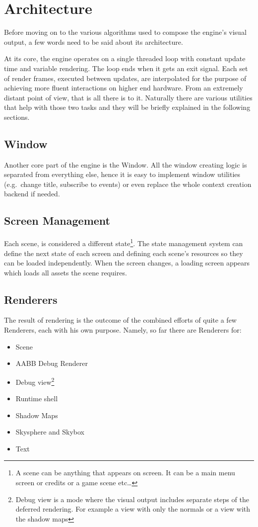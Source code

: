 \section{Architecture}
Before moving on to the various algorithms used to compose the engine's visual output, a few
words need to be said about its architecture.

At its core, the engine operates on a single threaded loop with constant update time and
variable rendering. The loop ends when it gets an exit signal. Each set of render frames,
executed between updates, are interpolated for the purpose of achieving more fluent interactions
on higher end hardware. From an extremely distant point of view, that is all there is to it.
Naturally there are various utilities that help with those two tasks and they will be briefly
explained in the following sections.

\subsection{Window}
Another core part of the engine is the Window. All the window creating logic
is separated from everything else, hence it is easy to implement window utilities (e.g.\ change
title, subscribe to events) or even replace the whole context creation backend if needed.

\subsection{Screen Management}
Each scene, is considered a different state\footnote{A scene can be anything that appears on
screen. It can be a main menu screen or credits or a game scene etc\dots}. The state management
system can define the next state of each screen and defining each scene's resources
so they can be loaded independently. When the screen changes, a loading screen appears which loads
all assets the scene requires.

\subsection{Renderers}
The result of rendering is the outcome of the combined efforts of quite a few Renderers, each
with his own purpose. Namely, so far there are Renderers for:

\begin{itemize}
\item Scene
\item AABB Debug Renderer
\item Debug view\footnote{Debug view is a mode where the visual output includes separate steps
      of the deferred rendering. For example a view with only the normals or a view with the
      shadow maps}
\item Runtime shell
\item Shadow Maps
\item Skysphere and Skybox
\item Text
\end{itemize}

